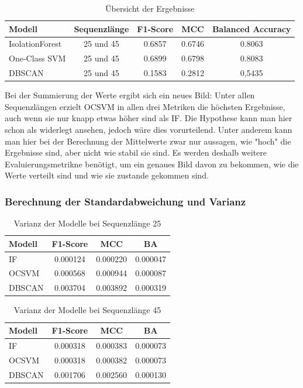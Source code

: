 \documentclass[a4paper,12pt]{article}
\begin{document}
	\begin{table}[H]
		\centering
		\caption{Übersicht der Ergebnisse}
		\begin{tabular}{lcccc}
			\hline
			Modell & Sequenzlänge & F1-Score & MCC & Balanced Accuracy \\
			\hline
			IsolationForest & 25 und 45 & 0.6857 & 0.6746 & 0.8063 \\
			One-Class SVM & 25 und 45 & 0.6899 & 0.6798 & 0.8083	  \\
			DBSCAN & 25 und 45 & 0.1583 & 0.2812 & 0,5435 \\
			\hline
		\end{tabular}
	\end{table}
	Bei der Summierung der Werte ergibt sich ein neues Bild: Unter allen Sequenzlängen erzielt OCSVM in allen drei Metriken die höchsten Ergebnisse, auch wenn sie nur knapp etwas höher sind als IF. Die Hypothese kann man hier schon als widerlegt ansehen, jedoch wäre dies vorurteilend. Unter anderem kann man hier bei der Berechnung der Mittelwerte zwar nur aussagen, wie "hoch" die Ergebnisse sind, aber nicht wie stabil sie sind. Es werden deshalb weitere Evaluierungsmetrikne benötigt, um ein genaues Bild davon zu bekommen, wie die Werte verteilt sind und wie sie zustande gekommen sind. 
	
	
	\subsubsection{Berechnung der Standardabweichung und Varianz}
	\begin{table}[H]
		\centering
		\caption{Varianz der Modelle bei Sequenzlänge 25}
		\begin{tabular}{lccc}
			\hline
			Modell & F1-Score & MCC & BA \\
			\hline
			IF     & 0.000124 & 0.000220 & 0.000047 \\
			OCSVM  & 0.000568 & 0.000944 & 0.000087 \\
			DBSCAN & 0.003704 & 0.003892 & 0.000319 \\
			\hline
		\end{tabular}
	\end{table}
	
	\begin{table}[H]
		\centering
		\caption{Varianz der Modelle bei Sequenzlänge 45}
		\begin{tabular}{lccc}
			\hline
			Modell & F1-Score & MCC & BA \\
			\hline
			IF     & 0.000318 & 0.000383 & 0.000073 \\
			OCSVM  & 0.000318 & 0.000382 & 0.000073 \\
			DBSCAN & 0.001706 & 0.002560 & 0.000130 \\
			\hline
		\end{tabular}
	\end{table}
	
\end{document}
